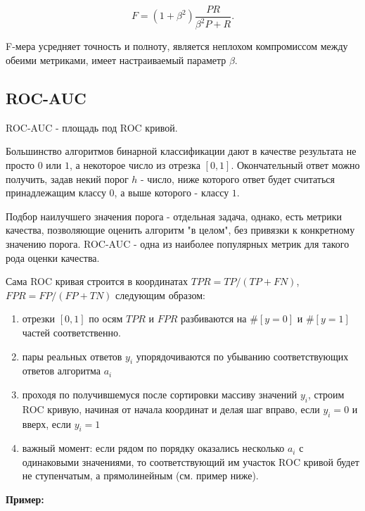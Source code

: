 $$
F = (1+\beta^2)\frac{PR}{\beta^2P + R}.
$$

F-мера усредняет точность и полноту, является неплохом компромиссом между обеими метриками, имеет настраиваемый параметр $\beta$.

\subsection{ROC-AUC}

ROC-AUC - площадь под ROC кривой. 

Большинство алгоритмов бинарной классификации дают в качестве результата не просто $0$ или $1$, а некоторое число из отрезка $[0, 1]$. Окончательный ответ можно получить, задав некий порог $h$ - число, ниже которого ответ будет считаться принадлежащим классу $0$, а выше которого - классу $1$. 

Подбор наилучшего значения порога - отдельная задача, однако, есть метрики качества, позволяющие оценить алгоритм "в целом", без привязки к конкретному значению порога. ROC-AUC - одна из наиболее популярных метрик для такого рода оценки качества. 

Сама ROC кривая строится в координатах $TPR = TP/(TP + FN)$, $FPR = FP/(FP + TN)$ следующим образом:
\begin{enumerate}
    \item отрезки $[0, 1]$ по осям $TPR$ и $FPR$ разбиваются на $\#[y=0]$ и $\#[y=1]$ частей соответственно.
    \item пары реальных ответов $y_i$ упорядочиваются по убыванию соответствующих ответов алгоритма $a_i$
    \item проходя по получившемуся после сортировки массиву значений $y_i$, строим ROC кривую, начиная от начала координат и делая шаг вправо, если $y_i=0$ и вверх, если $y_i=1$
    \item важный момент: если рядом по порядку оказались несколько $a_i$ с одинаковыми значениями, то соответствующий им участок ROC кривой будет не ступенчатым, а прямолинейным (см. пример ниже).
\end{enumerate}


\textbf{Пример:}

